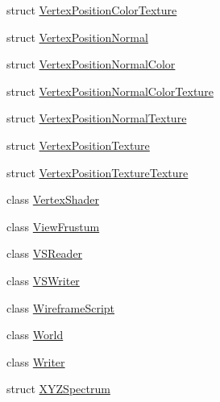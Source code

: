 \begin{DoxyCompactItemize}
\item 
struct \hyperlink{structmage_1_1_vertex_position_color_texture}{Vertex\+Position\+Color\+Texture}
\item 
struct \hyperlink{structmage_1_1_vertex_position_normal}{Vertex\+Position\+Normal}
\item 
struct \hyperlink{structmage_1_1_vertex_position_normal_color}{Vertex\+Position\+Normal\+Color}
\item 
struct \hyperlink{structmage_1_1_vertex_position_normal_color_texture}{Vertex\+Position\+Normal\+Color\+Texture}
\item 
struct \hyperlink{structmage_1_1_vertex_position_normal_texture}{Vertex\+Position\+Normal\+Texture}
\item 
struct \hyperlink{structmage_1_1_vertex_position_texture}{Vertex\+Position\+Texture}
\item 
struct \hyperlink{structmage_1_1_vertex_position_texture_texture}{Vertex\+Position\+Texture\+Texture}
\item 
class \hyperlink{classmage_1_1_vertex_shader}{Vertex\+Shader}
\item 
class \hyperlink{classmage_1_1_view_frustum}{View\+Frustum}
\item 
class \hyperlink{classmage_1_1_v_s_reader}{V\+S\+Reader}
\item 
class \hyperlink{classmage_1_1_v_s_writer}{V\+S\+Writer}
\item 
class \hyperlink{classmage_1_1_wireframe_script}{Wireframe\+Script}
\item 
class \hyperlink{classmage_1_1_world}{World}
\item 
class \hyperlink{classmage_1_1_writer}{Writer}
\item 
struct \hyperlink{structmage_1_1_x_y_z_spectrum}{X\+Y\+Z\+Spectrum}
\end{DoxyCompactItemize}

